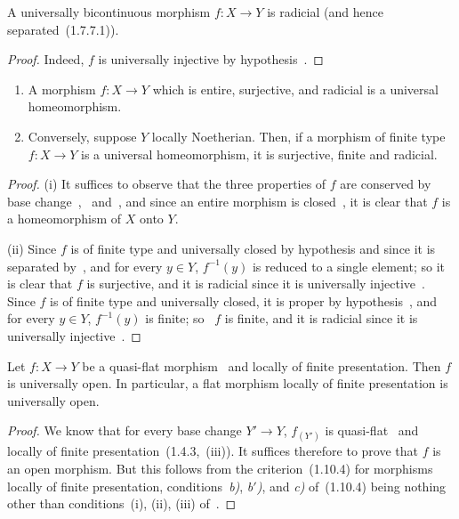 \begin{proposition}[2.4.4]
\label{IV.2.4.4}
A universally bicontinuous morphism $f:X\to Y$ is radicial \textnormal{(}and hence separated~(1.7.7.1)\textnormal{)}.
\end{proposition}

\begin{proof}
Indeed, $f$ is universally injective by hypothesis~.
\end{proof}

\begin{proposition}[2.4.5]
\label{IV.2.4.5}
\medskip\noindent
\begin{enumerate}[label=(\roman*)]
  \item A morphism $f:X\to Y$ which is entire, surjective, and radicial is a universal homeomorphism.
  \item Conversely, suppose $Y$ locally Noetherian. Then, if a morphism of finite type $f:X\to Y$ is a universal homeomorphism, it is surjective, finite and radicial.
\end{enumerate}
\end{proposition}

\begin{proof}
(i) It suffices to observe that the three properties of $f$ are conserved by base change~,~ and~, and since an entire morphism is closed~, it is clear that $f$ is a homeomorphism of $X$ onto $Y$.

(ii) Since $f$ is of finite type and universally closed by hypothesis and since it is separated by~, and for every $y\in Y$, $f^{-1}(y)$ is reduced to a single element; so it is clear that $f$ is surjective, and it is radicial since it is universally injective~.
Since $f$ is of finite type and universally closed, it is proper by hypothesis~, and for every $y\in Y$, $f^{-1}(y)$ is finite; so~ $f$ is finite, and it is radicial since it is universally injective~.
\end{proof}

\begin{theorem}[2.4.6]
\label{IV.2.4.6}
Let $f:X\to Y$ be a quasi-flat morphism~ and locally of finite presentation.
Then $f$ is universally open.
In particular, a flat morphism locally of finite presentation is universally open.
\end{theorem}

\begin{proof}
We know that for every base change $Y'\to Y$, $f_{(Y')}$ is quasi-flat~ and locally of finite presentation~(1.4.3,~(iii)).
It suffices therefore to prove that $f$ is an
open morphism.
But this follows from the criterion~(1.10.4) for morphisms locally of finite presentation, conditions~\emph{b)}, \emph{b$'$)}, and \emph{c)} of~(1.10.4) being nothing other than conditions~(i), (ii), (iii) of~.
\end{proof}


